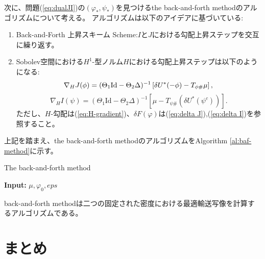 次に、問題(\ref{eq:dualJI})の$(\varphi_*, \psi_*)$を見つけるthe back-and-forth methodのアルゴリズムについて考える。
アルゴリズムは以下のアイデアに基づいている$:$
\begin{enumerate}
    \item Back-and-Forth 上昇スキーム Scheme:$I$と$J$における勾配上昇ステップを交互に繰り返す。
    \item Sobolev空間における$H^1$-型ノルム$H$における勾配上昇ステップは以下のようになる:
        \begin{equation*}
            \nabla_H J(\phi) = (\Theta_1 \text{Id} - \Theta_2 \Delta)^{-1} \left[\delta U^*(- \phi)-  T_{\phi \#} \mu \right], \\
        \end{equation*}
        \begin{equation*}
            \nabla_H I(\psi) = (\Theta_1 \text{Id} - \Theta_2 \Delta)^{-1} \left[\mu - T_{\psi \#} (\delta U^*(\psi^c))\right].
        \end{equation*}
    ただし、$H$-勾配は(\ref{eq:H-gradient})、$\delta F(\varphi)$は(\ref{eq:delta J}),(\ref{eq:delta I})を参照すること。
\end{enumerate}

上記を踏まえ、the back-and-forth methodのアルゴリズムをAlgorithm \ref{al:baf-method}に示す。

\begin{algorithm}[tb]
    \caption{The back-and-forth method}
    \label{al:baf-method}
    \begin{algorithmic}[1]
        \State \textbf{Input:} $\mu, \varphi_0, eps$
        \EndFor
    \end{algorithmic}
\end{algorithm}






back-and-forth methodは二つの固定された密度における最適輸送写像を計算するアルゴリズムである。

\section{まとめ}